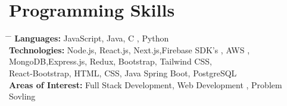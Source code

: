 
\section*{Programming Skills}
\begin{tabbing}
    \hspace{4cm} \= \hspace{4cm} \= \kill
    \textbf{Languages:} \> JavaScript, Java, C , Python\\
    \textbf{Technologies:} \> Node.js, React.js, Next.js,Firebase SDK's , AWS , MongoDB,Express.js, Redux, Bootstrap, Tailwind CSS, \\
    \> React-Bootstrap, HTML, CSS, Java Spring Boot, PostgreSQL \\
    \textbf{Areas of Interest:} \> Full Stack Development, Web Development , Problem Sovling
\end{tabbing}